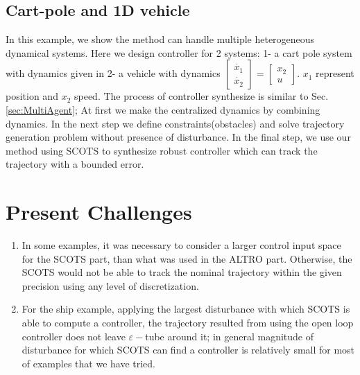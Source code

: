 \subsection{Cart-pole and 1D vehicle}
In this example, we show the method can handle multiple heterogeneous dynamical systems. Here we design controller for 2 systems: 1- a cart pole system with dynamics given in \cite{6313077} 2- a vehicle with dynamics 
$\begin{bmatrix} \dot{x_1}\\ \dot{x_2} \end{bmatrix}=\begin{bmatrix} x_2\\ u \end{bmatrix}  $.
$x_1$ represent position and $x_2$ speed. The process of controller synthesize is similar to Sec. \ref{sec:MultiAgent}; At first we make the centralized dynamics by combining dynamics. In the next step we define constraints(obstacles) and solve trajectory generation problem without presence of disturbance. In the final step, we use our method using SCOTS to synthesize robust controller which can track the trajectory with a bounded error.  



\section{Present Challenges}

\begin{enumerate}
	\item In some examples, it was necessary to consider a larger control input space for the SCOTS part, than what was used in the ALTRO part.
	Otherwise, the SCOTS would not be able to track the nominal trajectory within the given precision using any level of discretization. 
	\item For the ship example, applying the largest disturbance with which SCOTS is able to compute a controller, the trajectory resulted from using the open loop controller does not leave  $\varepsilon-$tube around it; in general magnitude of disturbance for which SCOTS can find a controller is relatively small for most of examples that we have tried.
\end{enumerate}



